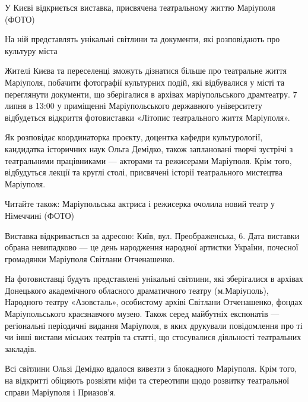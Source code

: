  
 
 
 
 

У Києві відкриється виставка, присвячена театральному життю Маріуполя (ФОТО)

На ній представлять унікальні світлини та документи, які розповідають про культуру міста

Жителі Києва та переселенці зможуть дізнатися більше про театральне життя
Маріуполя, побачити фотографії культурних подій, які відбувалися у місті та
переглянути документи, що зберігалися в архівах маріупольського драмтеатру. 7
липня в 13:00 у приміщенні Маріупольського державного університету відбудеться
відкриття фотовиставки «Літопис театрального життя Маріуполя».

Як розповідає координаторка проєкту, доцентка кафедри культурології, кандидатка
історичних наук Ольга Демідко, також заплановані творчі зустрічі з театральними
працівниками — акторами та режисерами Маріуполя. Крім того, відбудуться лекції
та круглі столі, присвячені історії театрального мистецтва Маріуполя.

Читайте також: Маріупольська актриса і режисерка очолила новий театр у
Німеччині (ФОТО) 

Виставка відкривається за адресою: Київ, вул. Преображенська, 6. Дата виставки
обрана невипадково — це день народження народної артистки України, почесної
громадянки Маріуполя Світлани Отченашенко.

На фотовиставці будуть представлені унікальні світлини, які зберігалися в
архівах Донецького академічного обласного драматичного театру (м.Маріуполь),
Народного театру «Азовсталь», особистому архіві Світлани Отченашенко, фондах
Маріупольського краєзнавчого музею. Також серед майбутніх експонатів —
регіональні періодичні видання Маріуполя, в яких друкували повідомлення про ті
чи інші вистави міських театрів та статті, що стосувалися діяльності
театральних закладів.

Всі світлини Ользі Демідко вдалося вивезти з блокадного Маріуполя. Крім того,
на відкритті обіцяють розвіяти міфи та стереотипи щодо розвитку театральної
справи Маріуполя і Приазов'я.

